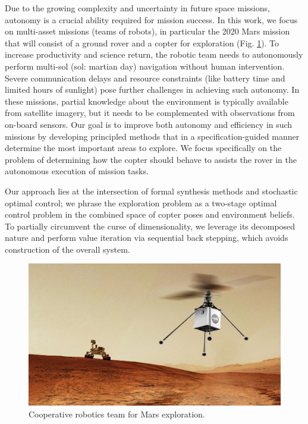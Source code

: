 \documentclass[conference]{IEEEtran}
\begin{document}
Due to the growing complexity and uncertainty in future space missions, autonomy is a crucial ability required for mission success. In this work, we focus on multi-asset missions (teams of robots), in particular the 2020 Mars mission that will consist of a ground rover and a copter for exploration (Fig. \ref{fig:heli-rover}). To increase productivity and science return, the robotic team needs to autonomously perform multi-sol (sol: martian day) navigation without human intervention. Severe communication delays and resource constraints (like battery time and limited hours of sunlight) pose further challenges in achieving such autonomy. In these missions, partial knowledge about the environment is typically available from satellite imagery, but it needs to be complemented with observations from on-board sensors. Our goal is to improve both autonomy and efficiency in such missions by developing principled methods that in a specification-guided manner determine the most important areas to explore. We focus specifically on the problem of determining how the copter should behave to assists the rover in the autonomous execution of mission tasks.


Our approach lies at the intersection of formal synthesis methods and stochastic optimal control; we phrase the exploration problem as a two-stage optimal control problem in the combined space of copter poses and environment beliefs.
To partially circumvent the curse of dimensionality, %
we leverage its decomposed nature and perform value iteration via sequential back stepping, which avoids construction of the overall system.
\begin{figure}
  \begin{center}
    \includegraphics[width=0.8\columnwidth]{figs/heli-rover.png}
  \end{center}
  \caption{Cooperative robotics team for Mars exploration.}
  \label{fig:heli-rover}
\end{figure}
\end{document}
